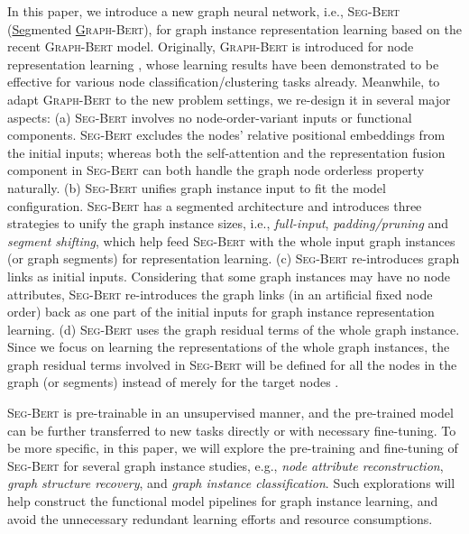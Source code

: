 \documentclass{article}
\newcommand{\our}{\textsc{Seg-Bert}}
\newcommand{\gbert}{\textsc{Graph-Bert}}
\begin{document}
In this paper, we introduce a new graph neural network, i.e., {\our} (\underline{Se}gmented \textsc{\underline{G}raph-Bert}), for graph instance representation learning based on the recent {\gbert} model. Originally, {\gbert} is introduced for node representation learning \cite{zhang2020graph}, whose learning results have been demonstrated to be effective for various node classification/clustering tasks already. Meanwhile, to adapt {\gbert} to the new problem settings, we re-design it in several major aspects: (a) {\our} involves no node-order-variant inputs or functional components. {\our} excludes the nodes' relative positional embeddings from the initial inputs; whereas both the self-attention \cite{Vaswani_Attention_17} and the representation fusion component in {\our} can both handle the graph node orderless property naturally. (b) {\our} unifies graph instance input to fit the model configuration. {\our} has a segmented architecture and introduces three strategies to unify the graph instance sizes, i.e., \textit{full-input}, \textit{padding/pruning} and \textit{segment shifting}, which help feed {\our} with the whole input graph instances (or graph segments) for representation learning. (c) {\our} re-introduces graph links as initial inputs. Considering that some graph instances may have no node attributes, {\our} re-introduces the graph links (in an artificial fixed node order) back as one part of the initial inputs for graph instance representation learning. (d) {\our} uses the graph residual terms of the whole graph instance. Since we focus on learning the representations of the whole graph instances, the graph residual terms involved in {\our} will be defined for all the nodes in the graph (or segments) instead of merely for the target nodes \cite{zhang2020graph}.

{\our} is pre-trainable in an unsupervised manner, and the pre-trained model can be further transferred to new tasks directly or with necessary fine-tuning. To be more specific, in this paper, we will explore the pre-training and fine-tuning of {\our} for several graph instance studies, e.g., \textit{node attribute reconstruction}, \textit{graph structure recovery}, and \textit{graph instance classification}. Such explorations will help construct the functional model pipelines for graph instance learning, and avoid the unnecessary redundant learning efforts and resource consumptions.
\end{document}
